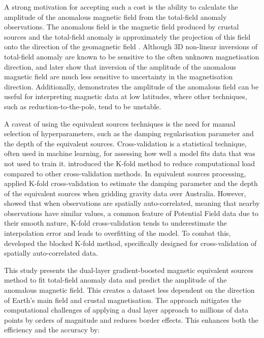 A strong motivation for accepting such a cost is the ability to calculate the amplitude of the anomalous magnetic field from the total-field anomaly observations. The anomalous field is the magnetic field produced by crustal sources and the total-field anomaly is approximately the projection of this field onto the direction of the geomagnetic field \citep{Blakley1995}. Although 3D non-linear inversions of total-field anomaly are known to be sensitive to the often unknown magnetisation direction, \citet{Li2010_remanent} and later \citet{HidalgoGato2021} show that inversion of the amplitude of the anomalous magnetic field are much less sensitive to uncertainty in the magnetisation direction. Additionally, \citet{Melo2021} demonstrates the amplitude of the anomalous field can be useful for interpreting magnetic data at low latitudes, where other techniques, such as reduction-to-the-pole, tend to be unstable.

A caveat of using the equivalent sources techniques is the need for manual selection of hyperparameters, such as the damping regularisation parameter and the depth of the equivalent sources. Cross-validation is a statistical technique, often used in machine learning, for assessing how well a model fits data that was not used to train it. \citet{Geisser1975} introduced the K-fold method to reduce computational load compared to other cross-validation methods. In equivalent sources processing, \citet{Soler2021} applied K-fold cross-validation to estimate the damping parameter and the depth of the equivalent sources when gridding gravity data over Australia. However, \citet{Roberts2017} showed that when observations are spatially auto-correlated, meaning that nearby observations have similar values, a common feature of Potential Field data due to their smooth nature, K-fold cross-validation tends to underestimate the interpolation error and leads to overfitting of the model. To combat this, \citet{Roberts2017} developed the blocked K-fold method, specifically designed for cross-validation of spatially auto-correlated data.

This study presents the dual-layer gradient-boosted magnetic equivalent sources method to fit total-field anomaly data and predict the amplitude of the anomalous magnetic field. This creates a dataset less dependent on the direction of Earth’s main field and crustal magnetisation. The approach mitigates the computational challenges of applying a dual layer approach to millions of data points by orders of magnitude and reduces border effects. This enhances both the efficiency and the accuracy by:

